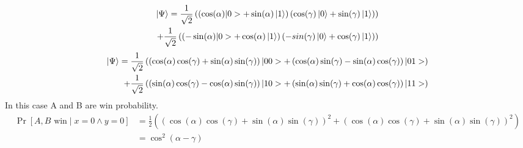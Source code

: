 \begin{equation*}
\begin{aligned}
\ket{\Psi }= \frac{1}{\sqrt{2}}\left( \left(\cos(\alpha)|0>+\sin(\alpha)\ket{1} \right) \left(\cos(\gamma)\ket{0}+\sin(\gamma)\ket{1} \right) \right)  \\  
+  \frac{1}{\sqrt{2}} \left( \left(-\sin(\alpha)|0>+\cos(\alpha)\ket{1} \right) \left(-sin(\gamma)\ket{0}+\cos(\gamma)\ket{1} \right) \right)
\end{aligned}
\end{equation*}
\begin{equation*}
\begin{aligned}
\ket{\Psi} = \frac{1}{\sqrt{2}}\left(\left(\cos(\alpha) \cos(\gamma)+\sin(\alpha) \sin(\gamma)\right)|00>+\left( \cos(\alpha)  \sin(\gamma)-\sin(\alpha)  \cos(\gamma)\right)|01>\right)\\
+\frac{1}{\sqrt{2}}\left( \left( \sin(\alpha)  \cos(\gamma)-\cos(\alpha) \sin(\gamma)\right)|10>+\left(\sin(\alpha)  \sin(\gamma)+\cos(\alpha)  \cos(\gamma)\right)|11>\right)
\end{aligned}
\end{equation*}
In this case A and B are win probability.
\begin{align}
 \Pr[A,B \text{ win}  \mid  x=0 \wedge y=0]&=\frac{1}{2}\left(\left(\cos(\alpha) \cos(\gamma)+\sin(\alpha)\sin(\gamma)\right)^2   +\left(\cos(\alpha) \cos(\gamma)+\sin(\alpha)\sin(\gamma)\right)^2  \right)\nonumber\\ 
&=\cos^2(\alpha-\gamma)\label{eq2}
\end{align}

